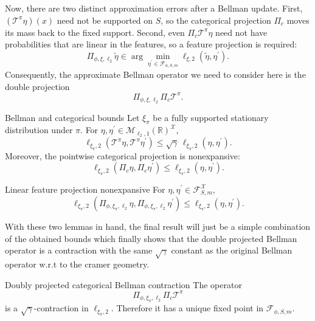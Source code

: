 \documentclass[12pt]{article}
\newcommand{\R}{\mathbb{R}}
\newcommand{\1}{\mathds{1}}
\newcommand{\X}{\mathcal{X}}
\newcommand{\T}{\mathcal{T}}
\begin{document}
Now, there are two distinct approximation errors after a Bellman update. First,
$(\T^\pi\eta)(x)$ need not be supported on $S$, so the categorical projection
$\Pi_c$ moves its mass back to the fixed support. Second, even
$\Pi_c\T^\pi\eta$ need not have probabilities that are linear in the features,
so a feature projection is required:
$$
  \Pi_{\phi,\xi,\ell_2}\widetilde\eta
  \in
  \arg\min_{\eta^{\prime}\in\mathcal F_{\phi,S,m}}
  \ell_{\xi,2}(\widetilde\eta,\eta^{\prime}).
$$
Consequently, the approximate Bellman operator we need to consider here is the double projection
$$
  \Pi_{\phi,\xi,\ell_2}\Pi_c\T^\pi.
$$

\begin{lemma}{Bellman and categorical bounds
\cite[Lemma 9.14]{bellemare2023distributional}}{}
Let $\xi_\pi$ be a fully supported stationary distribution under $\pi$. For
$\eta,\eta^{\prime}\in\mathcal M_{\ell_2,1}(\R)^\X$,
$$
  \ell_{\xi_\pi,2}(\T^\pi\eta,\T^\pi\eta^{\prime})
  \leq
  \sqrt{\gamma}\,\ell_{\xi_\pi,2}(\eta,\eta^{\prime}).
$$
Moreover, the pointwise categorical projection is nonexpansive:
$$
  \ell_{\xi_\pi,2}(\Pi_c\eta,\Pi_c\eta^{\prime})
  \leq
  \ell_{\xi_\pi,2}(\eta,\eta^{\prime}).
$$
\end{lemma}

\begin{lemma}{Linear feature projection nonexpansive
\cite[Lemma 9.16]{bellemare2023distributional}}{}
For $\eta,\eta^{\prime}\in\mathcal F_{S,m}^{\X}$,
$$
  \ell_{\xi_\pi,2}
  \left(
    \Pi_{\phi,\xi_\pi,\ell_2}\eta,
    \Pi_{\phi,\xi_\pi,\ell_2}\eta^{\prime}
  \right)
  \leq
  \ell_{\xi_\pi,2}(\eta,\eta^{\prime}).
$$
\end{lemma}

With these two lemmas in hand, the final result will just be a simple combination of the obtained bounds which finally shows that the double projected Bellman operator is a contraction with the same $\sqrt{\gamma}$ constant as the original Bellman operator w.r.t to the cramer geometry.

\begin{theorem}{Doubly projected categorical Bellman contraction
\cite[Theorem 9.13]{bellemare2023distributional}}{}
The operator
$$
  \Pi_{\phi,\xi_\pi,\ell_2}\Pi_c\T^\pi
$$
is a $\sqrt{\gamma}$-contraction in $\ell_{\xi_\pi,2}$. Therefore it has a
unique fixed point in $\mathcal F_{\phi,S,m}$.
\end{theorem}
\end{document}
